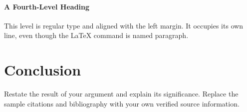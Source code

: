 \documentclass[font=termes]{mbts}
\begin{document}
\paragraph{A Fourth-Level Heading}
This level is regular type and aligned with the left margin. It occupies its
own line, even though the LaTeX command is named paragraph.

\section{Conclusion}
Restate the result of your argument and explain its significance. Replace the
sample citations and bibliography with your own verified source information.

\begin{mbtsbibliography}
\end{mbtsbibliography}
\end{document}
